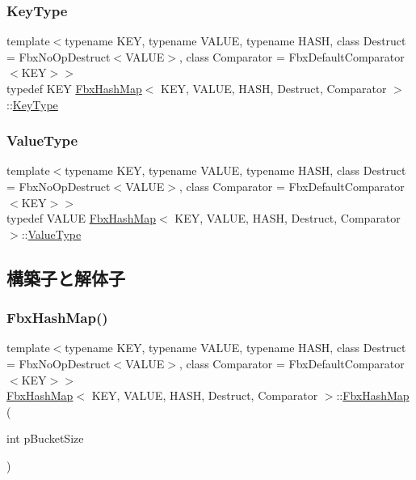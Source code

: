 \subsubsection{\texorpdfstring{Key\+Type}{KeyType}}
{\footnotesize\ttfamily template$<$typename K\+EY, typename V\+A\+L\+UE, typename H\+A\+SH, class Destruct = Fbx\+No\+Op\+Destruct$<$\+V\+A\+L\+U\+E$>$, class Comparator = Fbx\+Default\+Comparator$<$\+K\+E\+Y$>$$>$ \\
typedef K\+EY \hyperlink{class_fbx_hash_map}{Fbx\+Hash\+Map}$<$ K\+EY, V\+A\+L\+UE, H\+A\+SH, Destruct, Comparator $>$\+::\hyperlink{class_fbx_hash_map_ab56799173b6c58b676a94370b64ddbb0}{Key\+Type}}

\mbox{\label{class_fbx_hash_map_a9c4cfd0138aa9233c119403f3cc85501}} 
\subsubsection{\texorpdfstring{Value\+Type}{ValueType}}
{\footnotesize\ttfamily template$<$typename K\+EY, typename V\+A\+L\+UE, typename H\+A\+SH, class Destruct = Fbx\+No\+Op\+Destruct$<$\+V\+A\+L\+U\+E$>$, class Comparator = Fbx\+Default\+Comparator$<$\+K\+E\+Y$>$$>$ \\
typedef V\+A\+L\+UE \hyperlink{class_fbx_hash_map}{Fbx\+Hash\+Map}$<$ K\+EY, V\+A\+L\+UE, H\+A\+SH, Destruct, Comparator $>$\+::\hyperlink{class_fbx_hash_map_a9c4cfd0138aa9233c119403f3cc85501}{Value\+Type}}



\subsection{構築子と解体子}
\mbox{\label{class_fbx_hash_map_aa7eae049539759ac5dc0e058346da332}} 
\subsubsection{\texorpdfstring{Fbx\+Hash\+Map()}{FbxHashMap()}\hspace{0.1cm}{\footnotesize\ttfamily [1/2]}}
{\footnotesize\ttfamily template$<$typename K\+EY, typename V\+A\+L\+UE, typename H\+A\+SH, class Destruct = Fbx\+No\+Op\+Destruct$<$\+V\+A\+L\+U\+E$>$, class Comparator = Fbx\+Default\+Comparator$<$\+K\+E\+Y$>$$>$ \\
\hyperlink{class_fbx_hash_map}{Fbx\+Hash\+Map}$<$ K\+EY, V\+A\+L\+UE, H\+A\+SH, Destruct, Comparator $>$\+::\hyperlink{class_fbx_hash_map}{Fbx\+Hash\+Map} (\begin{DoxyParamCaption}\item[{int}]{p\+Bucket\+Size }\end{DoxyParamCaption})}

